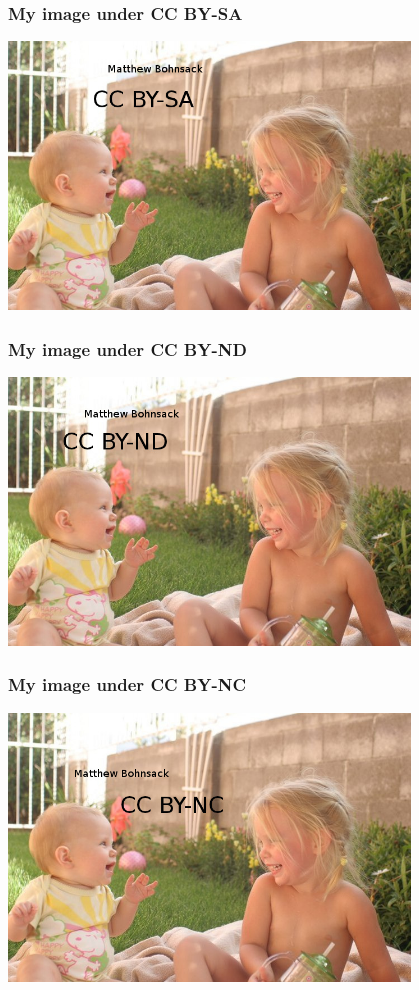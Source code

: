 \documentclass[mathserif,xcolor=dvipsnames,hyperref={bookmarks=true}]{beamer}
\begin{document}
\begin{frame}[t]
    \frametitle{My image under CC BY-SA}
    \begin{center}
        \includegraphics[width=0.8\textwidth]{../images/mine/cc-by-sa.jpg}
    \end{center}
\end{frame}
\begin{frame}[t]
    \frametitle{My image under CC BY-ND}
    \begin{center}
        \includegraphics[width=0.8\textwidth]{../images/mine/cc-by-nd.jpg}
    \end{center}
\end{frame}
\begin{frame}[t]
    \frametitle{My image under CC BY-NC}
    \begin{center}
        \includegraphics[width=0.8\textwidth]{../images/mine/cc-by-nc.jpg}
    \end{center}
\end{frame}
\end{document}

